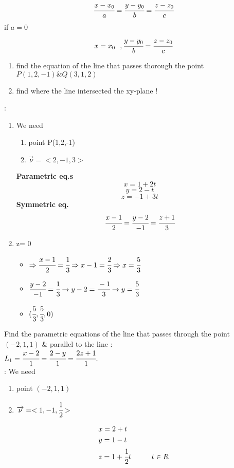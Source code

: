  {\color{smalt(darkpowderblue)}{symmetric equation}}
 $$\cfrac{x-x_0}{a} = \cfrac{y-y_0}{b} = \cfrac{z-z_0}{c}$$
 if $a=0$
 $$ x=x_0 ~~, \cfrac{y-y_0}{b} = \cfrac{z-z_0}{c}$$
 \noindent{\color{smalt(darkpowderblue)}\rule{\linewidth}{.2mm}}
\begin{example}
\begin{enumerate}
    \item find the equation of the line that passes thorough the point $P(1,2,-1) \& Q(3,1,2)$
    \item  find where the line intersected the xy-plane !
\end{enumerate}
  {} : 
  \begin{enumerate}
      \item We need 
  \begin{enumerate}
      \item point P(1,2,-1)
      \item $\overrightarrow{\nu} = <2,-1,3>$
      \end{enumerate}

\textbf{Parametric eq.s}
$$x = 1+2t$$               
$$y= 2-t$$
$$z = -1+3t$$
\textbf{Symmetric eq.}
$$\cfrac{x-1}{2} = \cfrac{y-2}{-1} = \cfrac{z+1}{3}$$
\item  z= 0  
\begin{itemize}
    \item $\Rightarrow \cfrac{x-1}{2} = \cfrac{1}{3} \\ \Rightarrow x-1 =\cfrac{2}{3} \\ \Rightarrow x = \cfrac{5}{3}$ 
    \item $\cfrac{y-2}{-1} = \cfrac{1}{3} \rightarrow y-2 = \cfrac{-1}{3} \rightarrow y=\cfrac{5}{3}$
    \item $(\cfrac{5}{3} , \cfrac{5}{3} , 0)$
\end{itemize}
 \end{enumerate}
 \end{example}
 \noindent{\color{smalt(darkpowderblue)}\rule{\linewidth}{.2mm}}
\begin{example}
Find the parametric equations of the line that passes through the point $(-2,1,1)$ \& parallel to the line :\\$L_1 = \cfrac{x-2}{1} = \cfrac{2-y}{1} = \cfrac{2z+1}{1}.$\\
  {}: We need 
\begin{enumerate}
    \item  point $(-2,1,1)$
    \item $\overrightarrow{\nu} = <1,-1,\cfrac{1}{2}>$
\end{enumerate}
\begin{align*}
    &x=2+t \\
    &y=1-t \\
    &z=1+\cfrac{1}{2}t \hspace{1cm} t \in R
\end{align*}
\end{example}
\noindent{\color{smalt(darkpowderblue)}\rule{\linewidth}{.2mm}}